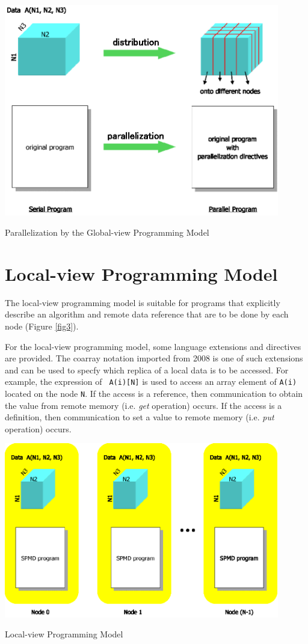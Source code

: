 \begin{myfigure}
\includegraphics[width=12cm]{figs/Fig2.eps}
  \caption{Parallelization by the Global-view Programming Model}
\label{fig2}
\end{myfigure}

\section{Local-view Programming Model}

The local-view programming model is suitable for programs that
explicitly describe an algorithm and remote data reference that are to
be done by each node (Figure \ref{fig3}).

For the local-view programming model, some language extensions and 
directives are provided. The coarray notation imported from {\Fort} 2008
is one of such extensions and can be used to specfy which replica of a
local data is to be accessed. For example, the expression of {\tt
A(i)[N]} is used to access an array element of {\tt A(i)} located on the
node {\tt N}.
%
If the access is a reference, then communication to obtain the value
from remote memory (i.e. {\it get} operation) occurs. If the access is a
definition, then communication to set a value to remote memory
(i.e. {\it put} operation) occurs.

\begin{myfigure}
\includegraphics[width=12cm]{figs/Fig3.eps}
  \caption{Local-view Programming Model}
\label{fig3}
\end{myfigure}

